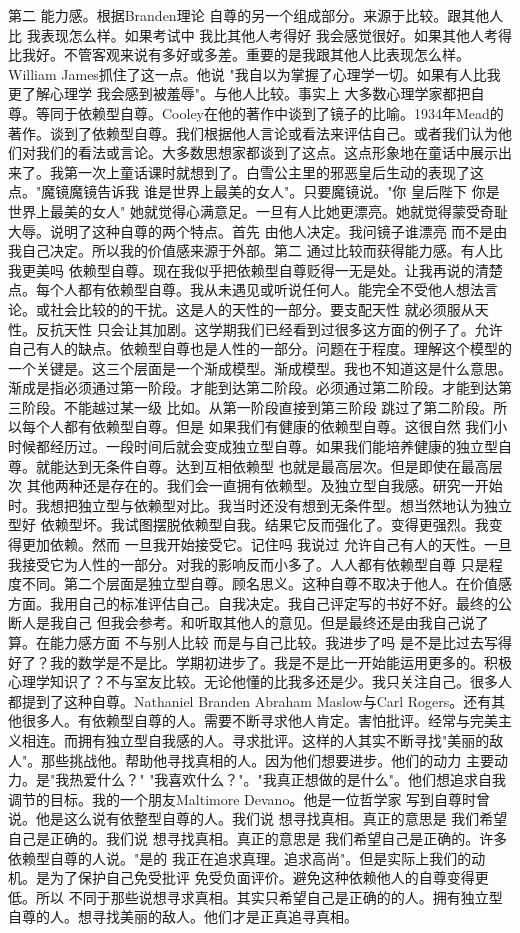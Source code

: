 第二 能力感。根据Branden理论 自尊的另一个组成部分。来源于比较。跟其他人比 我表现怎么样。如果考试中 我比其他人考得好 我会感觉很好。如果其他人考得比我好。不管客观来说有多好或多差。重要的是我跟其他人比表现怎么样。William James抓住了这一点。他说 "我自以为掌握了心理学一切。如果有人比我更了解心理学 我会感到被羞辱"。与他人比较。事实上 大多数心理学家都把自尊。等同于依赖型自尊。Cooley在他的著作中谈到了镜子的比喻。1934年Mead的著作。谈到了依赖型自尊。我们根据他人言论或看法来评估自己。或者我们认为他们对我们的看法或言论。大多数思想家都谈到了这点。这点形象地在童话中展示出来了。我第一次上童话课时就想到了。白雪公主里的邪恶皇后生动的表现了这点。"魔镜魔镜告诉我 谁是世界上最美的女人"。只要魔镜说。"你 皇后陛下 你是世界上最美的女人" 她就觉得心满意足。一旦有人比她更漂亮。她就觉得蒙受奇耻大辱。说明了这种自尊的两个特点。首先 由他人决定。我问镜子谁漂亮 而不是由我自己决定。所以我的价值感来源于外部。第二 通过比较而获得能力感。有人比我更美吗 依赖型自尊。现在我似乎把依赖型自尊贬得一无是处。让我再说的清楚点。每个人都有依赖型自尊。我从未遇见或听说任何人。能完全不受他人想法言论。或社会比较的的干扰。这是人的天性的一部分。要支配天性 就必须服从天性。反抗天性 只会让其加剧。这学期我们已经看到过很多这方面的例子了。允许自己有人的缺点。依赖型自尊也是人性的一部分。问题在于程度。理解这个模型的一个关键是。这三个层面是一个渐成模型。渐成模型。我也不知道这是什么意思。渐成是指必须通过第一阶段。才能到达第二阶段。必须通过第二阶段。才能到达第三阶段。不能越过某一级 比如。从第一阶段直接到第三阶段 跳过了第二阶段。所以每个人都有依赖型自尊。但是 如果我们有健康的依赖型自尊。这很自然 我们小时候都经历过。一段时间后就会变成独立型自尊。如果我们能培养健康的独立型自尊。就能达到无条件自尊。达到互相依赖型 也就是最高层次。但是即使在最高层次 其他两种还是存在的。我们会一直拥有依赖型。及独立型自我感。研究一开始时。我想把独立型与依赖型对比。我当时还没有想到无条件型。想当然地认为独立型好 依赖型坏。我试图摆脱依赖型自我。结果它反而强化了。变得更强烈。我变得更加依赖。然而 一旦我开始接受它。记住吗 我说过 允许自己有人的天性。一旦我接受它为人性的一部分。对我的影响反而小多了。人人都有依赖型自尊 只是程度不同。第二个层面是独立型自尊。顾名思义。这种自尊不取决于他人。在价值感方面。我用自己的标准评估自己。自我决定。我自己评定写的书好不好。最终的公断人是我自己 但我会参考。和听取其他人的意见。但是最终还是由我自己说了算。在能力感方面 不与别人比较 而是与自己比较。我进步了吗 是不是比过去写得好了？我的数学是不是比。学期初进步了。我是不是比一开始能运用更多的。积极心理学知识了？不与室友比较。无论他懂的比我多还是少。我只关注自己。很多人都提到了这种自尊。Nathaniel Branden Abraham Maslow与Carl Rogers。还有其他很多人。有依赖型自尊的人。需要不断寻求他人肯定。害怕批评。经常与完美主义相连。而拥有独立型自我感的人。寻求批评。这样的人其实不断寻找"美丽的敌人"。那些挑战他。帮助他寻找真相的人。因为他们想要进步。他们的动力 主要动力。是"我热爱什么？" "我喜欢什么？"。"我真正想做的是什么"。他们想追求自我调节的目标。我的一个朋友Maltimore Devano。他是一位哲学家 写到自尊时曾说。他是这么说有依整型自尊的人。我们说 想寻找真相。真正的意思是 我们希望自己是正确的。我们说 想寻找真相。真正的意思是 我们希望自己是正确的。许多依赖型自尊的人说。"是的 我正在追求真理。追求高尚"。但是实际上我们的动机。是为了保护自己免受批评 免受负面评价。避免这种依赖他人的自尊变得更低。所以 不同于那些说想寻求真相。其实只希望自己是正确的的人。拥有独立型自尊的人。想寻找美丽的敌人。他们才是正真追寻真相。 

